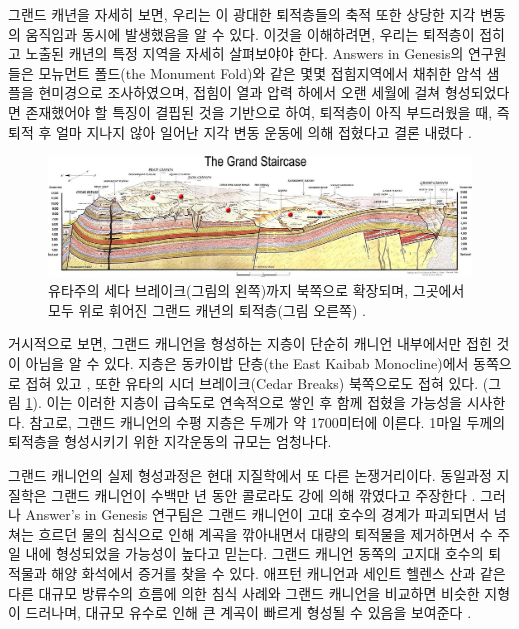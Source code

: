 \documentclass[10pt,twocolumn,letterpaper]{article}
\begin{document}
그랜드 캐년을 자세히 보면, 우리는 이 광대한 퇴적층들의 축적 또한  상당한 지각 변동의 움직임과 동시에 발생했음을 알 수 있다. 이것을 이해하려면, 우리는 퇴적층이 접히고 노출된 캐년의 특정 지역을 자세히 살펴보야야 한다.  Answers in Genesis의 연구원들은 \cite{42} 모뉴먼트 폴드(the Monument Fold)와 같은 몇몇 접힘지역에서 채취한 암석 샘플을 현미경으로 조사하였으며, 접힘이 열과 압력 하에서 오랜 세월에 걸쳐 형성되었다면 존재했어야 할 특징이 결핍된 것을 기반으로 하여, 퇴적층이 아직 부드러웠을 때, 즉 퇴적 후 얼마 지나지 않아 일어난 지각 변동 운동에 의해 접혔다고 결론 내렸다 \cite{43}.

\begin{figure}
\begin{center}
\includegraphics[width=1\textwidth]{Grand_Staircase-big.jpg}
\end{center}
   \caption{ 유타주의 세다 브레이크(그림의 왼쪽)까지 북쪽으로 확장되며, 그곳에서 모두 위로 휘어진 그랜드 캐년의 퇴적층(그림 오른쪽) \cite{50}.}
\label{fig:4}
\end{figure}

거시적으로 보면, 그랜드 캐니언을 형성하는 지층이 단순히 캐니언 내부에서만 접힌 것이 아님을 알 수 있다. 지층은 동카이밥 단층(the East Kaibab Monocline)에서 동쪽으로 접혀 있고 \cite{46}, 또한 유타의 시더 브레이크(Cedar Breaks) 북쪽으로도 접혀 있다. (그림 \ref{fig:4}). 이는 이러한 지층이 급속도로 연속적으로 쌓인 후 함께 접혔을 가능성을 시사한다. 참고로, 그랜드 캐니언의 수평 지층은 두께가 약 1700미터에 이른다. 1마일 두께의 퇴적층을 형성시키기 위한 지각운동의 규모는 엄청나다.

그랜드 캐니언의 실제 형성과정은 현대 지질학에서 또 다른 논쟁거리이다. 동일과정 지질학은 그랜드 캐니언이 수백만 년 동안 콜로라도 강에 의해 깎였다고 주장한다 \cite{47}. 그러나 Answer's in Genesis 연구팀은 그랜드 캐니언이 고대 호수의 경계가 파괴되면서 넘쳐는 흐르던 물의 침식으로 인해 계곡을 깎아내면서 대량의 퇴적물을 제거하면서 수 주일 내에 형성되었을 가능성이 높다고 믿는다. 그랜드 캐니언 동쪽의 고지대 호수의 퇴적물과 해양 화석에서 증거를 찾을 수 있다. 애프턴 캐니언과 세인트 헬렌스 산과 같은 다른 대규모 방류수의 흐름에 의한 침식 사례와 그랜드 캐니언을 비교하면 비슷한 지형이 드러나며, 대규모 유수로 인해 큰 계곡이 빠르게 형성될 수 있음을 보여준다 \cite{48}.
\end{document}
